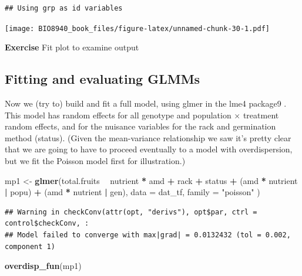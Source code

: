\documentclass[
  12pt,
]{book}
\newenvironment{Shaded}{\begin{snugshade}}{\end{snugshade}}
\newcommand{\DataTypeTok}[1]{\textcolor[rgb]{0.13,0.29,0.53}{#1}}
\newcommand{\KeywordTok}[1]{\textcolor[rgb]{0.13,0.29,0.53}{\textbf{#1}}}
\newcommand{\NormalTok}[1]{#1}
\newcommand{\OperatorTok}[1]{\textcolor[rgb]{0.81,0.36,0.00}{\textbf{#1}}}
\newcommand{\StringTok}[1]{\textcolor[rgb]{0.31,0.60,0.02}{#1}}
\begin{document}
\begin{verbatim}
## Using grp as id variables
\end{verbatim}

\texttt{[image: BIO8940\_book\_files/figure-latex/unnamed-chunk-30-1.pdf]}

\textbf{Exercise}
Fit plot to examine output

\hypertarget{fitting-and-evaluating-glmms}{%
\subsection{Fitting and evaluating GLMMs}\label{fitting-and-evaluating-glmms}}

Now we (try to) build and fit a full model, using glmer in the lme4 package9 . This model has random effects for all genotype and population × treatment random effects, and for the nuisance variables for the rack and germination method (status). (Given the mean-variance relationship we saw it's pretty clear that we are going to have to proceed eventually to a model with overdispersion, but we fit the Poisson model first for illustration.)

\begin{Shaded}
\begin{Highlighting}[]
\NormalTok{mp1 <-}\StringTok{ }\KeywordTok{glmer}\NormalTok{(total.fruits }\OperatorTok{~}\StringTok{ }\NormalTok{nutrient }\OperatorTok{*}\StringTok{ }\NormalTok{amd }\OperatorTok{+}
\StringTok{  }\NormalTok{rack }\OperatorTok{+}\StringTok{ }\NormalTok{status }\OperatorTok{+}
\StringTok{  }\NormalTok{(amd }\OperatorTok{*}\StringTok{ }\NormalTok{nutrient }\OperatorTok{|}\StringTok{ }\NormalTok{popu) }\OperatorTok{+}
\StringTok{  }\NormalTok{(amd }\OperatorTok{*}\StringTok{ }\NormalTok{nutrient }\OperatorTok{|}\StringTok{ }\NormalTok{gen),}
\DataTypeTok{data =}\NormalTok{ dat_tf, }\DataTypeTok{family =} \StringTok{"poisson"}
\NormalTok{)}
\end{Highlighting}
\end{Shaded}

\begin{verbatim}
## Warning in checkConv(attr(opt, "derivs"), opt$par, ctrl = control$checkConv, :
## Model failed to converge with max|grad| = 0.0132432 (tol = 0.002, component 1)
\end{verbatim}

\begin{Shaded}
\begin{Highlighting}[]
\KeywordTok{overdisp_fun}\NormalTok{(mp1)}
\end{Highlighting}
\end{Shaded}
\end{document}
